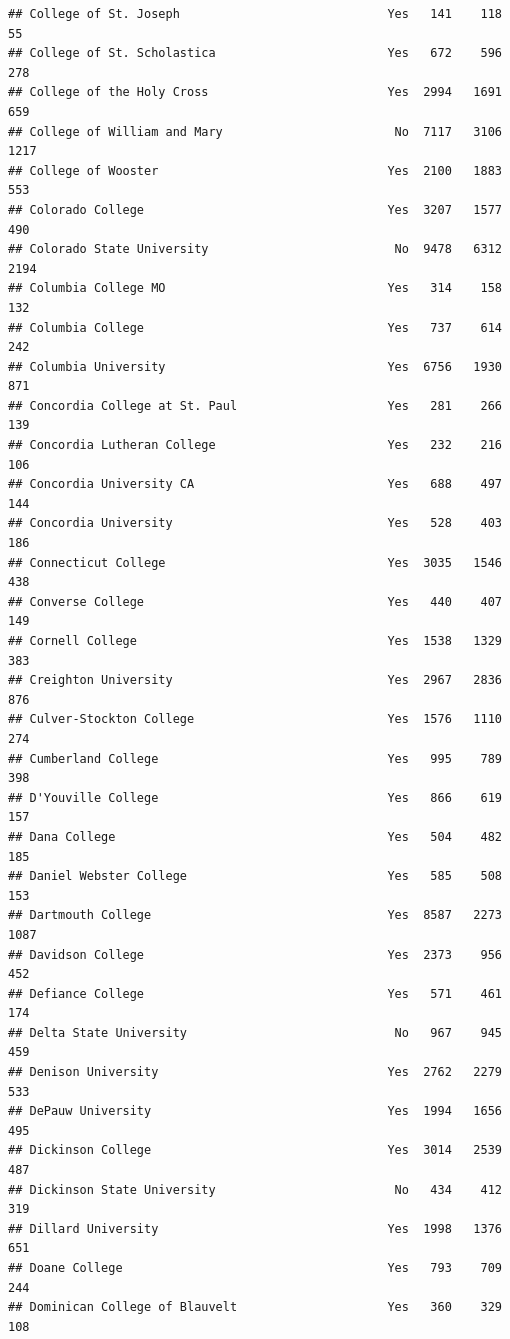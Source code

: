 \documentclass[
]{article}
\begin{document}
\begin{verbatim}
## College of St. Joseph                             Yes   141    118     55
## College of St. Scholastica                        Yes   672    596    278
## College of the Holy Cross                         Yes  2994   1691    659
## College of William and Mary                        No  7117   3106   1217
## College of Wooster                                Yes  2100   1883    553
## Colorado College                                  Yes  3207   1577    490
## Colorado State University                          No  9478   6312   2194
## Columbia College MO                               Yes   314    158    132
## Columbia College                                  Yes   737    614    242
## Columbia University                               Yes  6756   1930    871
## Concordia College at St. Paul                     Yes   281    266    139
## Concordia Lutheran College                        Yes   232    216    106
## Concordia University CA                           Yes   688    497    144
## Concordia University                              Yes   528    403    186
## Connecticut College                               Yes  3035   1546    438
## Converse College                                  Yes   440    407    149
## Cornell College                                   Yes  1538   1329    383
## Creighton University                              Yes  2967   2836    876
## Culver-Stockton College                           Yes  1576   1110    274
## Cumberland College                                Yes   995    789    398
## D'Youville College                                Yes   866    619    157
## Dana College                                      Yes   504    482    185
## Daniel Webster College                            Yes   585    508    153
## Dartmouth College                                 Yes  8587   2273   1087
## Davidson College                                  Yes  2373    956    452
## Defiance College                                  Yes   571    461    174
## Delta State University                             No   967    945    459
## Denison University                                Yes  2762   2279    533
## DePauw University                                 Yes  1994   1656    495
## Dickinson College                                 Yes  3014   2539    487
## Dickinson State University                         No   434    412    319
## Dillard University                                Yes  1998   1376    651
## Doane College                                     Yes   793    709    244
## Dominican College of Blauvelt                     Yes   360    329    108

\end{verbatim}
\end{document}
